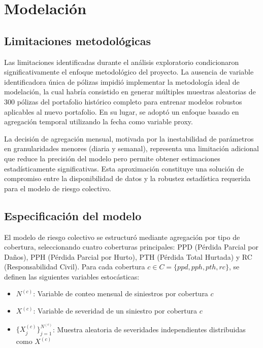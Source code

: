 \section{Modelación}

\subsection{Limitaciones metodológicas}

Las limitaciones identificadas durante el análisis exploratorio condicionaron significativamente el enfoque metodológico del proyecto. La ausencia de variable identificadora única de pólizas impidió implementar la metodología ideal de modelación, la cual habría consistido en generar múltiples muestras aleatorias de 300 pólizas del portafolio histórico completo para entrenar modelos robustos aplicables al nuevo portafolio. En su lugar, se adoptó un enfoque basado en agregación temporal utilizando la fecha como variable proxy.

La decisión de agregación mensual, motivada por la inestabilidad de parámetros en granularidades menores (diaria y semanal), representa una limitación adicional que reduce la precisión del modelo pero permite obtener estimaciones estadísticamente significativas. Esta aproximación constituye una solución de compromiso entre la disponibilidad de datos y la robustez estadística requerida para el modelo de riesgo colectivo.

\subsection{Especificación del modelo}

El modelo de riesgo colectivo se estructuró mediante agregación por tipo de cobertura, seleccionando cuatro coberturas principales: PPD (Pérdida Parcial por Daños), PPH (Pérdida Parcial por Hurto), PTH (Pérdida Total Hurtada) y RC (Responsabilidad Civil). Para cada cobertura $c \in C = \{ppd, pph, pth, rc\}$, se definen las siguientes variables estocásticas:

\begin{itemize}
\item $N^{(c)}$: Variable de conteo mensual de siniestros por cobertura $c$
\item $X^{(c)}$: Variable de severidad de un siniestro por cobertura $c$
\item $\{X^{(c)}_j\}_{j=1}^{N^{(c)}}$: Muestra aleatoria de severidades independientes distribuidas como $X^{(c)}$
\end{itemize}

